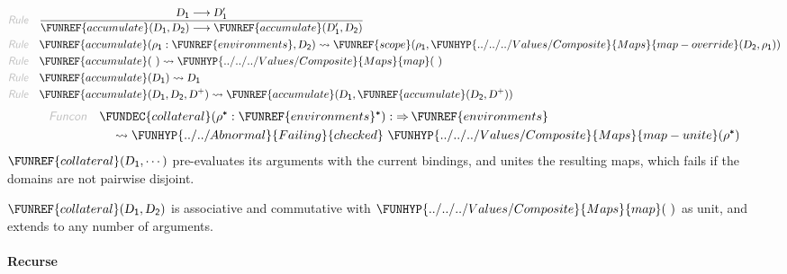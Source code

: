 \begin{align*}
  \KEY{Rule} \quad
    & \frac{
       \VAR{D}\SUB{1} \TRANS 
        \VAR{D}\SUB{1}'
      }{
       \FUNREF{accumulate}
                    (  \VAR{D}\SUB{1}, 
                           \VAR{D}\SUB{2} ) \TRANS 
        \FUNREF{accumulate}
          (  \VAR{D}\SUB{1}', 
                 \VAR{D}\SUB{2} )
      }
\\
  \KEY{Rule} \quad
    & \FUNREF{accumulate}
        (  \VAR{\ensuremath{\rho}}\SUB{1} : \FUNREF{environments}, 
               \VAR{D}\SUB{2} ) \leadsto 
        \FUNREF{scope}
          (  \VAR{\ensuremath{\rho}}\SUB{1}, 
                 \FUNHYP{../../../Values/Composite}{Maps}{map-override}
                  (  \VAR{D}\SUB{2}, 
                         \VAR{\ensuremath{\rho}}\SUB{1} ) )
\\
  \KEY{Rule} \quad
    & \FUNREF{accumulate}
        (   \  ) \leadsto 
        \FUNHYP{../../../Values/Composite}{Maps}{map}
          (   \  )
\\
  \KEY{Rule} \quad
    & \FUNREF{accumulate}
        (  \VAR{D}\SUB{1} ) \leadsto 
        \VAR{D}\SUB{1}
\\
  \KEY{Rule} \quad
    & \FUNREF{accumulate}
        (  \VAR{D}\SUB{1}, 
               \VAR{D}\SUB{2}, 
               \VAR{D}\PLUS ) \leadsto 
        \FUNREF{accumulate}
          (  \VAR{D}\SUB{1}, 
                 \FUNREF{accumulate}
                  (  \VAR{D}\SUB{2}, 
                         \VAR{D}\PLUS ) )
\end{align*}
\begin{align*}
  \KEY{Funcon} \quad
  & \FUNDEC{collateral}(
                     \VAR{\ensuremath{\rho}}\STAR : \FUNREF{environments}\STAR) 
    :  \TO \FUNREF{environments} \\&\quad
    \leadsto \FUNHYP{../../Abnormal}{Failing}{checked} \ 
               \FUNHYP{../../../Values/Composite}{Maps}{map-unite}
                 (  \VAR{\ensuremath{\rho}}\STAR )
\end{align*}
$\FUNREF{collateral}
    (  \VAR{D}\SUB{1}, 
           \cdots )$ pre-evaluates its arguments with the current bindings,
  and unites the resulting maps, which fails if the domains are not pairwise
  disjoint.

$\FUNREF{collateral}
    (  \VAR{D}\SUB{1}, 
           \VAR{D}\SUB{2} )$ is associative and commutative with $\FUNHYP{../../../Values/Composite}{Maps}{map}
    (   \  )$ as unit, 
  and extends to any number of arguments.

\paragraph{Recurse}\hypertarget{recurse}{}\label{recurse}

